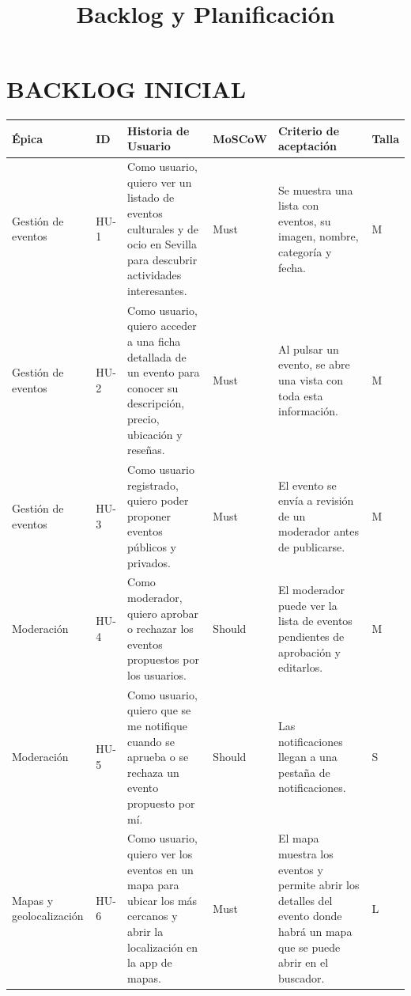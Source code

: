 \documentclass[12pt]{article}
\title{Backlog y Planificación}
\date{}
\begin{document}
\maketitle

\section{BACKLOG INICIAL}

\renewcommand{\arraystretch}{1.2}

\begin{longtable}{|p{2.0cm}|p{1.0cm}|p{5cm}|p{2cm}|p{4cm}|p{1cm}|}

\hline
\textbf{Épica} & \textbf{ID} & \textbf{Historia de Usuario} & \textbf{MoSCoW} & \textbf{Criterio de aceptación} & \textbf{Talla} \\
\hline

Gestión de eventos & HU-1 &
Como usuario, quiero ver un listado de eventos culturales y de ocio en Sevilla para descubrir actividades interesantes. &
Must &
Se muestra una lista con eventos, su imagen, nombre, categoría y fecha. &
M \\
\hline

Gestión de eventos & HU-2 &
Como usuario, quiero acceder a una ficha detallada de un evento para conocer su descripción, precio, ubicación y reseñas. &
Must &
Al pulsar un evento, se abre una vista con toda esta información. &
M \\
\hline

Gestión de eventos & HU-3 &
Como usuario registrado, quiero poder proponer eventos públicos y privados. &
Must &
El evento se envía a revisión de un moderador antes de publicarse. &
M \\
\hline

Moderación & HU-4 &
Como moderador, quiero aprobar o rechazar los eventos propuestos por los usuarios. &
Should &
El moderador puede ver la lista de eventos pendientes de aprobación y editarlos. &
M \\
\hline

Moderación & HU-5 &
Como usuario, quiero que se me notifique cuando se aprueba o se rechaza un evento propuesto por mí. &
Should &
Las notificaciones llegan a una pestaña de notificaciones. &
S \\
\hline

Mapas y geolocalización & HU-6 &
Como usuario, quiero ver los eventos en un mapa para ubicar los más cercanos y abrir la localización en la app de mapas. &
Must &
El mapa muestra los eventos y permite abrir los detalles del evento donde habrá un mapa que se puede abrir en el buscador. &
L \\
\hline


\end{longtable}
\end{document}
